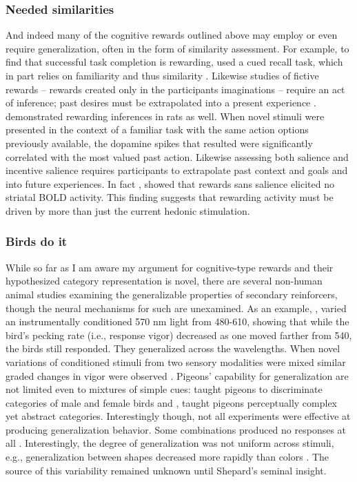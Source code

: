 \documentclass[doc,12pt]{apa}        %
\begin{document}
\subsubsection{Needed similarities}
\label{subsub:needed}
And indeed many of the cognitive rewards outlined above may employ or even require generalization, often in the form of similarity assessment.  For example, to find that successful task completion is rewarding,  used a cued recall task, which in part relies on familiarity \cite{Jacoby:1991p9096} and thus similarity \cite{Nosofsky:1988p9098}.  Likewise studies of fictive rewards -- rewards created only in the participants imaginations -- require an act of inference; past desires must be extrapolated into a present experience \cite{Hayden:2009p6545,Lohrenz:2007p7240}.  demonstrated rewarding inferences in rats as well.  When novel stimuli were presented in the context of a familiar task with the same action options previously available, the dopamine spikes that resulted were significantly correlated with the most valued past action.  Likewise assessing both salience and incentive salience requires participants to extrapolate past context and goals and into future experiences.  In fact , showed that rewards sans salience elicited no striatal BOLD activity.  This finding suggests that rewarding activity must be driven by more than just the current hedonic stimulation.

\subsubsection{Birds do it}
\label{subsub:birds}
While so far as I am aware my argument for cognitive-type rewards and their hypothesized category representation is novel, there are several non-human animal studies examining the generalizable properties of secondary reinforcers, though the neural mechanisms for such are unexamined.  As an example, , varied an instrumentally conditioned 570 nm light from 480-610, showing that while the bird's pecking rate (i.e., response vigor) decreased as one moved farther from 540, the birds still responded.  They generalized across the wavelengths.  When novel variations of conditioned stimuli from two sensory modalities were mixed similar graded changes in vigor were observed  \cite{Guttman:1956p8355}.  Pigeons' capability for generalization are not limited even to mixtures of simple cues: \cite{Nakamura:2006p9093} taught pigeons to discriminate categories of male and female birds and , taught pigeons perceptually complex yet abstract categories.  Interestingly though, not all experiments were effective at producing generalization behavior.  Some combinations produced no responses at all \cite{Blough:2001p8408,Simmons:2008p8405,Urcuioli:2001p8359}.  Interestingly, the degree of generalization was not uniform across stimuli, e.g., generalization between shapes decreased more rapidly than colors \cite{Shepard:1987p9102}.  The source of this variability remained unknown until Shepard's seminal insight.
\end{document}
